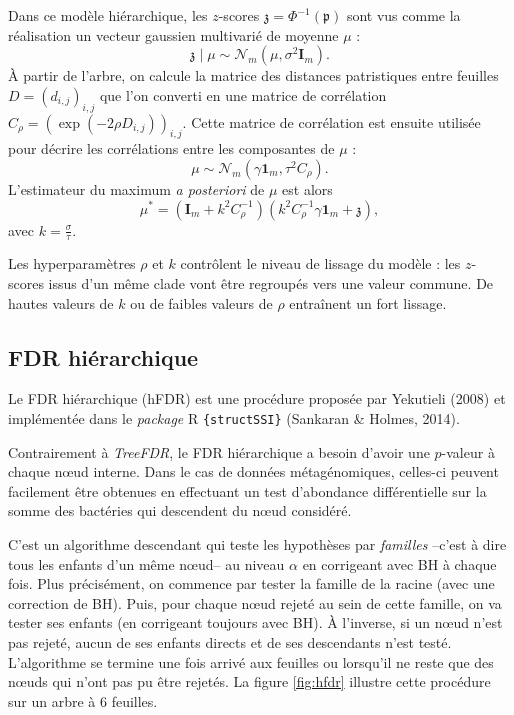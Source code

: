 \documentclass[12pt,a4paper]{reedthesis}
\newcommand \pv {\mathfrak{p}}
\newcommand \zs {\mathfrak{z}}
\theoremstyle{definition}
\theoremstyle{definition}
\theoremstyle{definition}
\theoremstyle{remark}
\begin{document}
Dans ce modèle hiérarchique, les \(z\)-scores \(\zs = \Phi^{-1}\left(\pv\right)\) sont vus comme la réalisation un vecteur gaussien multivarié de moyenne \(\mu\) :
\begin{equation*}
\left. \zs \mid \mu \right. \sim \mathcal{N}_m\left(\mu,\sigma^2 \mathbf{I}_m\right).
\end{equation*}
À partir de l'arbre, on calcule la matrice des distances patristiques entre feuilles \(D = (d_{i,j})_{i,j}\) que l'on converti en une matrice de corrélation \(C_{\rho} = \left(\exp\left(-2\rho D_{i,j}\right)\right)_{i,j}\). Cette matrice de corrélation est ensuite utilisée pour décrire les corrélations entre les composantes de \(\mu\) :
\begin{equation*}
\mu \sim \mathcal{N}_m\left(\gamma \mathbf{1}_m,\tau^2C_{\rho}\right).
\end{equation*}
L'estimateur du maximum \emph{a posteriori} de \(\mu\) est alors
\begin{equation*}
\mu^* = \left(\mathbf{I}_m + k^2 C_{\rho}^{-1}\right)\left(k^2 C_{\rho}^{-1} \gamma \mathbf{1}_m + \zs \right),
\end{equation*}
avec \(k = \frac{\sigma}{\tau}\).

Les hyperparamètres \(\rho\) et \(k\) contrôlent le niveau de lissage du modèle : les \(z\)-scores issus d'un même clade vont être regroupés vers une valeur commune. De hautes valeurs de \(k\) ou de faibles valeurs de \(\rho\) entraînent un fort lissage.

\hypertarget{fdr-hiuxe9rarchique}{%
\subsection{FDR hiérarchique}\label{fdr-hiuxe9rarchique}}

Le FDR hiérarchique (hFDR) est une procédure proposée par Yekutieli (2008) et implémentée dans le \emph{package} R \texttt{\{structSSI\}} (Sankaran \& Holmes, 2014).

Contrairement à \emph{TreeFDR}, le FDR hiérarchique a besoin d'avoir une \(p\)-valeur à chaque nœud interne. Dans le cas de données métagénomiques, celles-ci peuvent facilement être obtenues en effectuant un test d'abondance différentielle sur la somme des bactéries qui descendent du nœud considéré.

C'est un algorithme descendant qui teste les hypothèses par \emph{familles} --c'est à dire tous les enfants d'un même nœud-- au niveau \(\alpha\) en corrigeant avec BH à chaque fois. Plus précisément, on commence par tester la famille de la racine (avec une correction de BH). Puis, pour chaque nœud rejeté au sein de cette famille, on va tester ses enfants (en corrigeant toujours avec BH). À l'inverse, si un nœud n'est pas rejeté, aucun de ses enfants directs et de ses descendants n'est testé. L'algorithme se termine une fois arrivé aux feuilles ou lorsqu'il ne reste que des nœuds qui n'ont pas pu être rejetés. La figure \ref{fig:hfdr} illustre cette procédure sur un arbre à \(6\) feuilles.
\end{document}
